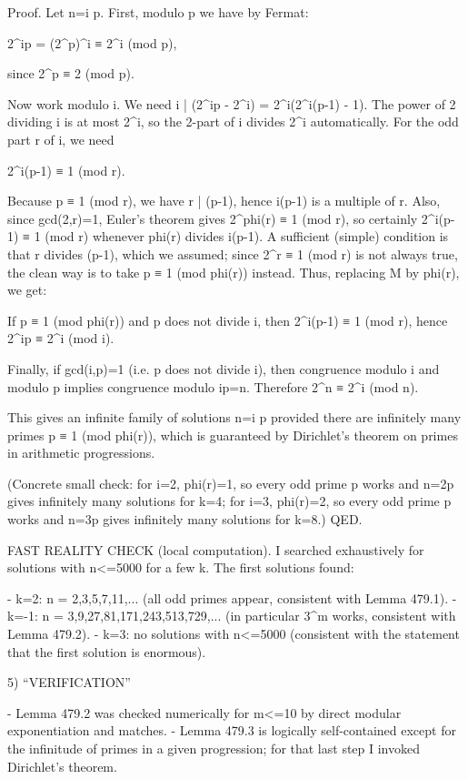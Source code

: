 Proof.
Let n=i p. First, modulo p we have by Fermat:

    2^{ip} = (2^p)^i ≡ 2^i (mod p),

since 2^p ≡ 2 (mod p).

Now work modulo i. We need i | (2^{ip} - 2^i) = 2^i(2^{i(p-1)} - 1). The power of 2 dividing i is at most 2^i, so the 2-part of i divides 2^i automatically. For the odd part r of i, we need

    2^{i(p-1)} ≡ 1 (mod r).

Because p ≡ 1 (mod r), we have r | (p-1), hence i(p-1) is a multiple of r. Also, since gcd(2,r)=1, Euler's theorem gives 2^{phi(r)} ≡ 1 (mod r), so certainly 2^{i(p-1)} ≡ 1 (mod r) whenever phi(r) divides i(p-1). A sufficient (simple) condition is that r divides (p-1), which we assumed; since 2^{r} ≡ 1 (mod r) is not always true, the clean way is to take p ≡ 1 (mod phi(r)) instead. Thus, replacing M by phi(r), we get:

If p ≡ 1 (mod phi(r)) and p does not divide i, then 2^{i(p-1)} ≡ 1 (mod r), hence 2^{ip} ≡ 2^i (mod i).

Finally, if gcd(i,p)=1 (i.e. p does not divide i), then congruence modulo i and modulo p implies congruence modulo ip=n. Therefore 2^n ≡ 2^i (mod n).

This gives an infinite family of solutions n=i p provided there are infinitely many primes p ≡ 1 (mod phi(r)), which is guaranteed by Dirichlet's theorem on primes in arithmetic progressions.

(Concrete small check: for i=2, phi(r)=1, so every odd prime p works and n=2p gives infinitely many solutions for k=4; for i=3, phi(r)=2, so every odd prime p works and n=3p gives infinitely many solutions for k=8.)  QED.

FAST REALITY CHECK (local computation).
I searched exhaustively for solutions with n<=5000 for a few k. The first solutions found:

- k=2: n = 2,3,5,7,11,... (all odd primes appear, consistent with Lemma 479.1).
- k=-1: n = 3,9,27,81,171,243,513,729,... (in particular 3^m works, consistent with Lemma 479.2).
- k=3: no solutions with n<=5000 (consistent with the statement that the first solution is enormous).

5) “VERIFICATION”

- Lemma 479.2 was checked numerically for m<=10 by direct modular exponentiation and matches.
- Lemma 479.3 is logically self-contained except for the infinitude of primes in a given progression; for that last step I invoked Dirichlet's theorem.

